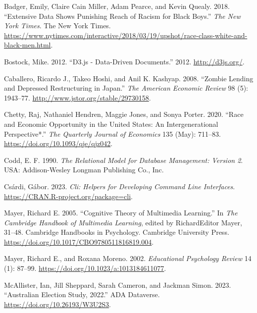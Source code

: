 \hypertarget{refs}{}
\begin{CSLReferences}{1}{0}
\leavevmode{}%
Badger, Emily, Claire Cain Miller, Adam Pearce, and Kevin Quealy. 2018. {``Extensive Data Shows Punishing Reach of Racism for Black Boys.''} \emph{The New York Times}. The New York Times. \url{https://www.nytimes.com/interactive/2018/03/19/upshot/race-class-white-and-black-men.html}.

\leavevmode{}%
Bostock, Mike. 2012. {``D3.js - Data-Driven Documents.''} 2012. \url{http://d3js.org/}.

\leavevmode{}%
Caballero, Ricardo J., Takeo Hoshi, and Anil K. Kashyap. 2008. {``Zombie Lending and Depressed Restructuring in {J}apan.''} \emph{The American Economic Review} 98 (5): 1943--77. \url{http://www.jstor.org/stable/29730158}.

\leavevmode{}%
Chetty, Raj, Nathaniel Hendren, Maggie Jones, and Sonya Porter. 2020. {``Race and Economic Opportunity in the United States: An Intergenerational Perspective*.''} \emph{The Quarterly Journal of Economics} 135 (May): 711--83. \url{https://doi.org/10.1093/qje/qjz042}.

\leavevmode{}%
Codd, E. F. 1990. \emph{The Relational Model for Database Management: Version 2}. USA: Addison-Wesley Longman Publishing Co., Inc.

\leavevmode{}%
Csárdi, Gábor. 2023. \emph{Cli: Helpers for Developing Command Line Interfaces}. \url{https://CRAN.R-project.org/package=cli}.

\leavevmode{}%
Mayer, Richard E. 2005. {``Cognitive Theory of Multimedia Learning.''} In \emph{The Cambridge Handbook of Multimedia Learning}, edited by RichardEditor Mayer, 31--48. Cambridge Handbooks in Psychology. Cambridge University Press. \url{https://doi.org/10.1017/CBO9780511816819.004}.

\leavevmode{}%
Mayer, Richard E., and Roxana Moreno. 2002. \emph{Educational Psychology Review} 14 (1): 87--99. \url{https://doi.org/10.1023/a:1013184611077}.

\leavevmode{}%
McAllister, Ian, Jill Sheppard, Sarah Cameron, and Jackman Simon. 2023. {``Australian Election Study, 2022.''} ADA Dataverse. \url{https://doi.org/10.26193/W3U2S3}.


\end{CSLReferences}
